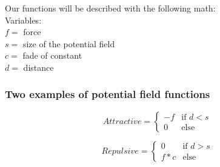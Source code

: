 		Our functions will be described with the following math: \\
		
		Variables:\\
		$f =$ force\\
		$s =$ size of the potential field\\
		$c =$ fade of constant\\
		$d =$ distance\\
		
		\subsubsection*{Two examples of potential field functions}
		
		\begin{displaymath}
			Attractive = \begin{cases}
					-f & \text{if $d < s$}\\
					0 & \text{else}
				\end{cases}		
		\end{displaymath}
			
		\begin{displaymath}
			Repulsive = \begin{cases}
					0 & \text{if $d > s$}\\
					f * c & \text{else}
				\end{cases}		
		\end{displaymath}
		
		